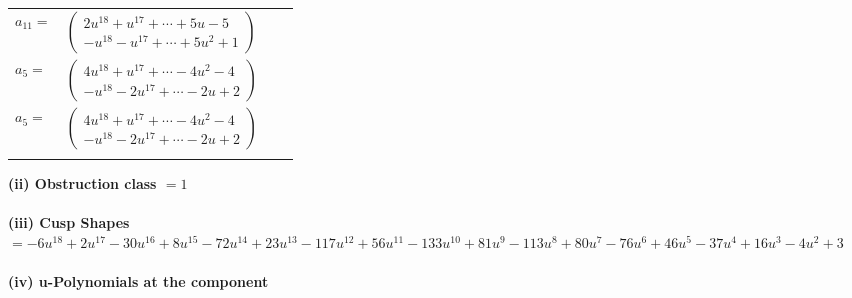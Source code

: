 \documentclass[1p]{elsarticle_modified}
\theoremstyle{definition}
\begin{document}
\begin{tabular}{m{7pt} m{180pt} m{7pt} m{180pt} }
\flushright $a_{11}=$&$\begin{pmatrix}2 u^{18}+u^{17}+\cdots+5 u-5\\- u^{18}- u^{17}+\cdots+5 u^2+1\end{pmatrix}$ \\
\flushright $a_{5}=$&$\begin{pmatrix}4 u^{18}+u^{17}+\cdots-4 u^2-4\\- u^{18}-2 u^{17}+\cdots-2 u+2\end{pmatrix}$\\ \flushright $a_{5}=$&$\begin{pmatrix}4 u^{18}+u^{17}+\cdots-4 u^2-4\\- u^{18}-2 u^{17}+\cdots-2 u+2\end{pmatrix}$\\&\end{tabular}
\flushleft \textbf{(ii) Obstruction class $= 1$}\\~\\
\flushleft \textbf{(iii) Cusp Shapes $= -6 u^{18}+2 u^{17}-30 u^{16}+8 u^{15}-72 u^{14}+23 u^{13}-117 u^{12}+56 u^{11}-133 u^{10}+81 u^9-113 u^8+80 u^7-76 u^6+46 u^5-37 u^4+16 u^3-4 u^2+3$}\\~\\
\newpage\renewcommand{\arraystretch}{1}
\flushleft \textbf{(iv) u-Polynomials at the component}\newline \\
\end{document}
